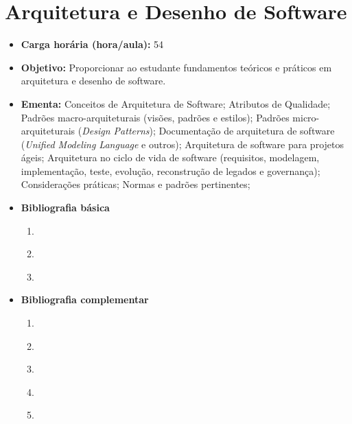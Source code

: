 \documentclass[
	10pt,				%
	openright,			%
	twoside,			%
	a4paper,			%
	english,			%
	french,				%
	brazil,				%
	sumario=tradicional
]{abntex2}
\begin{document}
\section*{Arquitetura e Desenho de Software}\label{2_arqsoft}
\begin{itemize}
	\item \textbf{Carga horária (hora/aula):} 54
	\item \textbf{Objetivo:} Proporcionar ao estudante fundamentos teóricos e práticos em arquitetura e desenho de software.
	\item \textbf{Ementa:} 
	Conceitos de Arquitetura de Software;
	Atributos de Qualidade;
	Padrões macro-arquiteturais (visões, padrões e estilos);
	Padrões micro-arquiteturais (\textit{Design Patterns});
	Documentação de arquitetura de software (\textit{Unified Modeling Language} e outros);
	Arquitetura de software para projetos ágeis;
	Arquitetura no ciclo de vida de software (requisitos, modelagem, implementação, teste, evolução, reconstrução de legados e governança);
	Considerações práticas;
	Normas e padrões pertinentes;
	\item \textbf{Bibliografia básica}
	\begin{enumerate}
		\item \cite{pressman2016engenharia}
		\item \cite{booch2012uml}
		\item \cite{larmanbragatortellojoao2008}
	\end{enumerate}
	\item \textbf{Bibliografia complementar}
	\begin{enumerate}
		\item \cite{sommerville2011engenharia}
		\item \cite{wazlawick2011analise}
		\item \cite{fowlertortello2005}
		\item \cite{teruel2012}
		\item \cite{gammahelmjohnsonvlissides2000}
	\end{enumerate}
\end{itemize}


\newpage
\end{document}
